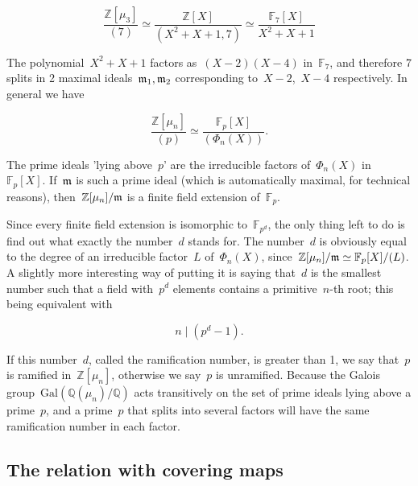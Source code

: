 \begin{equation}
  \frac{\mathbb{Z}[\mu_3]}{(7)} \simeq \frac{\mathbb{Z}[X]}{(X^2 + X + 1, 7)} \simeq \frac{\mathbb{F}_7[X]}{X^2 + X + 1}
\end{equation}

The polynomial~${X^2 + X + 1}$ factors as~${(X-2)(X-4)}$ in~${\mathbb{F}_7}$, and therefore 7 splits in 2 maximal ideals~${\frak{m}_1, \frak{m}_2}$ corresponding to~${X-2}$,~${X-4}$ respectively. In general we have

\begin{equation}
  \frac{\mathbb{Z}[\mu_n]}{(p)} \simeq \frac{\mathbb{F}_p[X]}{(\Phi_n(X))}.
\end{equation}

The prime ideals 'lying above~${p}$' are the irreducible factors of~${\Phi_n(X)}$ in~${\mathbb{F}_p[X]}$. If~${\frak{m}}$ is such a prime ideal (which is automatically maximal, for technical reasons), then~${\mathbb{Z}[\mu_n]/\frak{m}}$ is a finite field extension of~${\mathbb{F}_p}$.

Since every finite field extension is isomorphic to~${\mathbb{F}_{p^d}}$, the only thing left to do is find out what exactly the number~${d}$ stands for. The number~${d}$ is obviously equal to the degree of an irreducible factor~${L}$ of~${\Phi_n(X)}$, since~${\mathbb{Z}[\mu_n]/\frak{m}\simeq \mathbb{F}_p[X]/(L)}$. A slightly more interesting way of putting it is saying that~${d}$ is the smallest number such that a field with~${p^d}$ elements contains a primitive~${n}$-th root; this being equivalent with

\begin{equation}
  n \mid (p^d - 1) .
\end{equation}

If this number~${d}$, called the ramification number, is greater than 1, we say that~${p}$ is ramified in~${\mathbb{Z}[\mu_n]}$, otherwise we say~${p}$ is unramified. Because the Galois group~${\mathrm{Gal}(\mathbb{Q}(\mu_n) / \mathbb{Q})}$ acts transitively on the set of prime ideals lying above a prime~${p}$, and a prime~${p}$ that splits into several factors will have the same ramification number in each factor.

\subsection{The relation with covering maps}

